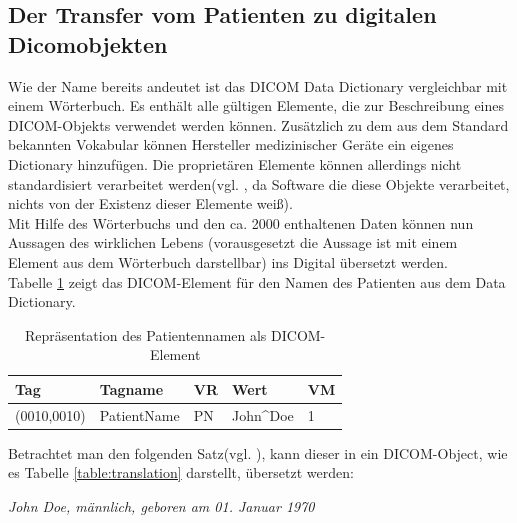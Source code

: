 \subsection{Der Transfer vom Patienten zu digitalen Dicomobjekten} \label{grundlagen:dicomObjects}
Wie der Name bereits andeutet ist das DICOM Data Dictionary vergleichbar mit einem Wörterbuch. Es enthält alle gültigen Elemente, die zur Beschreibung eines DICOM-Objekts verwendet werden können. Zusätzlich zu dem aus dem Standard bekannten Vokabular können Hersteller medizinischer Geräte ein eigenes Dictionary hinzufügen. Die proprietären Elemente können allerdings nicht standardisiert verarbeitet werden(vgl. \cite[S.45]{pianykh:dicom}, da Software die diese Objekte verarbeitet, nichts von der Existenz dieser Elemente weiß).\\
Mit Hilfe des Wörterbuchs und den ca. 2000 enthaltenen Daten können nun Aussagen des wirklichen Lebens (vorausgesetzt die Aussage ist mit einem Element aus dem Wörterbuch darstellbar) ins Digital übersetzt werden.\\
Tabelle \ref{table:patientname} zeigt das DICOM-Element für den Namen des Patienten aus dem Data Dictionary\cite[S. 14]{dicom:dd}.

\begin{table}
    \begin{tabularx}{\textwidth}{|X|X|X|X|X|}
    \toprule
    \hline
    \textbf{Tag}         & \textbf{Tagname}     & \textbf{VR} & \textbf{Wert}     	& \textbf{VM} \\ \hline
    (0010,0010) 		 & PatientName 			& PN 		  & John\^{}Doe 		& 1  \\  \hline
    \bottomrule
    \end{tabularx}
    \caption {Repräsentation des Patientennamen als DICOM-Element}
    \label{table:patientname}
\end{table}

Betrachtet man den folgenden Satz(vgl. \cite[S.46]{pianykh:dicom}), kann dieser in ein DICOM-Object, wie es Tabelle \ref*{table:translation} darstellt, übersetzt werden:
\begin{center}
\textit{\glqq John Doe, männlich, geboren am 01. Januar 1970\grqq}
\end{center}

